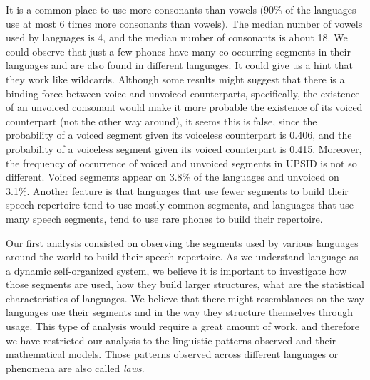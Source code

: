 It is a common place to use more consonants than vowels (90\% of the languages 
use at most 6 times more consonants than vowels). The median number of vowels used by
languages is 4, and the median number of consonants is about 18.
We could observe that just a few phones have many co-occurring segments in their 
languages and are also found in different languages. It could give us a hint that 
they work like wildcards. Although some results might suggest that there is a binding 
force between voice and unvoiced counterparts, specifically, the existence of
an unvoiced consonant would make it more probable the existence of its voiced 
counterpart (not the other way around), it seems this is false, since 
the probability of a voiced segment given its voiceless counterpart is
0.406, and the probability of a voiceless segment given its voiced counterpart
is 0.415. Moreover, the frequency of occurrence of voiced and unvoiced segments
in UPSID is not so different. Voiced segments appear on 3.8\% of the languages
and unvoiced on 3.1\%. Another feature is that languages that use fewer 
segments to build their speech repertoire tend to use mostly common segments,
and languages that use many speech segments, tend to use rare phones to
build their repertoire.


Our first analysis consisted on observing the segments used by various languages around the
world to build their speech repertoire. As we understand language as a dynamic self-organized
system, we believe it is important to investigate how those segments are used, how they
build larger structures, what are the statistical characteristics of languages.
We believe that there might resemblances on the way languages use their segments and in the way
they structure themselves through usage. This type of analysis would require a great amount
of work, and therefore we have restricted our analysis to the linguistic patterns
observed and their mathematical models. Those patterns observed across different languages
or phenomena are also called \emph{laws}.

